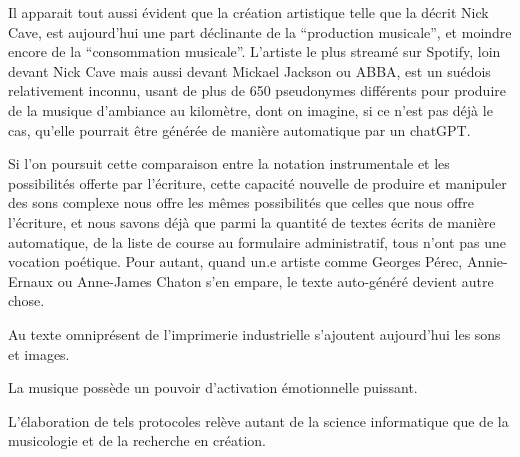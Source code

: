 Il apparait tout aussi évident que la création artistique telle que la décrit Nick Cave, est aujourd'hui une part déclinante de la ``production musicale'', et moindre encore de la ``consommation musicale''. L'artiste le plus streamé sur Spotify, loin devant Nick Cave mais aussi devant Mickael Jackson ou ABBA, est un suédois relativement inconnu, usant de plus de 650 pseudonymes différents pour produire de la musique d'ambiance au kilomètre, dont on imagine, si ce n'est pas déjà le cas, qu'elle pourrait être générée de manière automatique par un chatGPT. 

Si l'on poursuit cette comparaison entre la notation instrumentale et les possibilités offerte par l'écriture, cette capacité nouvelle de produire et manipuler des sons complexe nous offre les mêmes possibilités que celles que nous offre l'écriture, et nous savons déjà que parmi la quantité de textes écrits de manière automatique, de la liste de course au formulaire administratif, tous n'ont pas une vocation poétique. Pour autant, quand un.e artiste comme Georges Pérec, Annie-Ernaux ou Anne-James Chaton s'en empare, le texte auto-généré devient autre chose.

Au texte omniprésent de l'imprimerie industrielle s'ajoutent aujourd'hui les sons et images.

La musique possède un pouvoir d'activation émotionnelle puissant.



L'élaboration de tels protocoles relève autant de la science informatique que de la musicologie et de la recherche en création.




